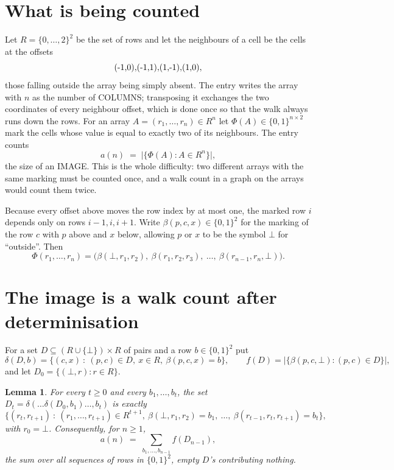 \documentclass[11pt,a4paper]{article}
\theoremstyle{plain}
\newtheorem{lemma}[theorem]{Lemma}
\theoremstyle{definition}
\begin{document}
\section{What is being counted}

Let $R=\{0,\dots,2\}^{2}$ be the set of rows and let the neighbours of a cell be the
cells at the offsets
\[
$(-1,0)$, $(-1,1)$, $(1,-1)$, $(1,0)$,
\]
those falling outside the array being simply absent. The entry writes the array with $n$ as the number of COLUMNS; transposing it exchanges the two coordinates of every neighbour offset, which is done once so that the walk always runs down the rows. For an array
$A=(r_1,\dots,r_n)\in R^n$ let $\Phi(A)\in\{0,1\}^{n\times2}$ mark the cells whose value
is equal to exactly two of its neighbours. The entry counts
\[
a(n)\;=\;\bigl|\{\Phi(A):A\in R^n\}\bigr| ,
\]
the size of an IMAGE. This is the whole difficulty: two different arrays with the same marking
must be counted once, and a walk count in a graph on the arrays would count them twice.

Because every offset above moves the row index by at most one, the marked row $i$ depends only
on rows $i-1,i,i+1$. Write $\beta(p,c,x)\in\{0,1\}^{2}$ for the marking of the row $c$
with $p$ above and $x$ below, allowing $p$ or $x$ to be the symbol $\bot$ for ``outside''.
Then
\[
\Phi(r_1,\dots,r_n)=\bigl(\beta(\bot,r_1,r_2),\ \beta(r_1,r_2,r_3),\ \dots,\
\beta(r_{n-1},r_n,\bot)\bigr).
\]

\section{The image is a walk count after determinisation}

For a set $D\subseteq(R\cup\{\bot\})\times R$ of pairs and a row $b\in\{0,1\}^{2}$ put
\[
\delta(D,b)=\{(c,x)\ :\ (p,c)\in D,\ x\in R,\ \beta(p,c,x)=b\},\qquad
f(D)=\bigl|\{\beta(p,c,\bot):(p,c)\in D\}\bigr| ,
\]
and let $D_0=\{(\bot,r):r\in R\}$.

\begin{lemma}\label{lem:det}
For every $t\ge0$ and every $b_1,\dots,b_t$, the set
$D_t=\delta(\dots\delta(D_0,b_1)\dots,b_t)$ is exactly
\[
\{(r_t,r_{t+1})\ :\ (r_1,\dots,r_{t+1})\in R^{t+1},\ \beta(\bot,r_1,r_2)=b_1,\ \dots,\
\beta(r_{t-1},r_t,r_{t+1})=b_t\} ,
\]
with $r_0=\bot$. Consequently, for $n\ge1$,
\[
a(n)\;=\;\sum_{b_1,\dots,b_{n-1}}f(D_{n-1}),
\]
the sum over all sequences of rows in $\{0,1\}^{2}$, empty $D$'s contributing nothing.
\end{lemma}
\end{document}
